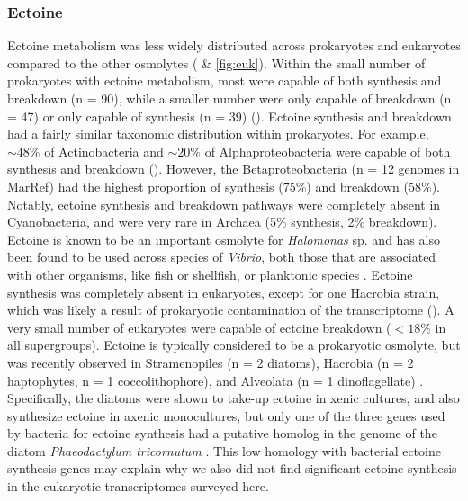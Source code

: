 \documentclass[utf8]{frontiersSCNS} %
\begin{document}
\subsubsection*{Ectoine}
Ectoine metabolism was less widely distributed across prokaryotes and eukaryotes compared to the other osmolytes ( \& \ref{fig:euk}). Within the small number of prokaryotes with ectoine metabolism, most were capable of both synthesis and breakdown (n = 90), while a smaller number were only capable of breakdown (n = 47) or only capable of synthesis (n = 39) (). Ectoine synthesis and breakdown had a fairly similar taxonomic distribution within prokaryotes. For example, $\sim 48\%$ of Actinobacteria and $\sim20\%$ of Alphaproteobacteria were capable of both synthesis and breakdown (). However, the Betaproteobacteria (n = 12 genomes in MarRef) had the highest proportion of synthesis (75\%) and breakdown (58\%). Notably, ectoine synthesis and breakdown pathways were completely absent in Cyanobacteria, and were very rare in Archaea (5\% synthesis, 2\% breakdown). Ectoine is known to be an important osmolyte for \emph{Halomonas} sp. \citep{Ono1999} and has also been found to be used across species of \emph{Vibrio}, both those that are associated with other organisms, like fish or shellfish, or planktonic species \citep{Pflughoeft2003,Ongagna-Yhombi2013,Ma2017}. Ectoine synthesis was completely absent in eukaryotes, except for one Hacrobia strain, which was likely a result of prokaryotic contamination of the transcriptome (). A very small number of eukaryotes were capable of ectoine breakdown ($< 18\%$ in all supergroups). Ectoine is typically considered to be a prokaryotic osmolyte, but was recently observed in Stramenopiles (n = 2 diatoms), Hacrobia (n = 2 haptophytes, n = 1 coccolithophore), and Alveolata (n = 1 dinoflagellate) \citep{Fenizia2020}. Specifically, the diatoms were shown to take-up ectoine in xenic cultures, and also synthesize ectoine in axenic monocultures, but only one of the three genes used by bacteria for ectoine synthesis had a putative homolog in the genome of the diatom \emph{Phaeodactylum tricornutum} \citep{Fenizia2020}. This low homology with bacterial ectoine synthesis genes may explain why we also did not find significant ectoine synthesis in the eukaryotic transcriptomes surveyed here.
\end{document}
